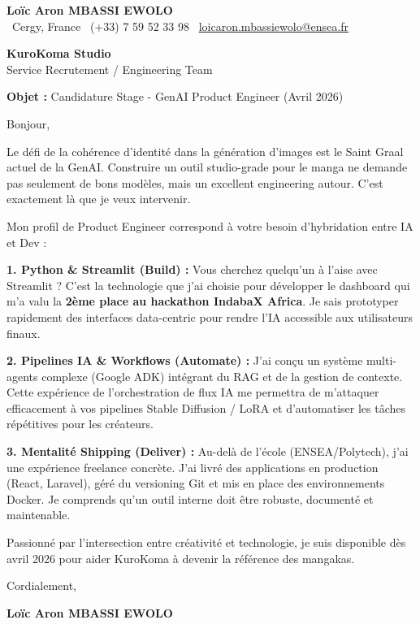 \documentclass[a4paper,11pt]{article}
\begin{document}
\begin{center}
    {\Large \textbf{Loïc Aron MBASSI EWOLO}}\\[4pt]
    \small
    \faMapMarker\ Cergy, France \quad
    \faPhone\ (+33) 7 59 52 33 98 \quad
    \faEnvelope\ \href{mailto:loicaron.mbassiewolo@ensea.fr}{loicaron.mbassiewolo@ensea.fr}
\end{center}
\vspace{0.5cm}

\hfill
\begin{minipage}[t]{0.45\textwidth}
    \textbf{KuroKoma Studio}\\
    Service Recrutement / Engineering Team
\end{minipage}

\vspace{1cm}

\textbf{Objet :} Candidature Stage - GenAI Product Engineer (Avril 2026)

Bonjour,

Le défi de la cohérence d'identité dans la génération d'images est le Saint Graal actuel de la GenAI. Construire un outil studio-grade pour le manga ne demande pas seulement de bons modèles, mais un excellent engineering autour. C'est exactement là que je veux intervenir.

Mon profil de Product Engineer correspond à votre besoin d'hybridation entre IA et Dev :

\textbf{1. Python & Streamlit (Build) :}
Vous cherchez quelqu'un à l'aise avec Streamlit ? C'est la technologie que j'ai choisie pour développer le dashboard qui m'a valu la \textbf{2ème place au hackathon IndabaX Africa}. Je sais prototyper rapidement des interfaces data-centric pour rendre l'IA accessible aux utilisateurs finaux.

\textbf{2. Pipelines IA & Workflows (Automate) :}
J'ai conçu un système multi-agents complexe (Google ADK) intégrant du RAG et de la gestion de contexte. Cette expérience de l'orchestration de flux IA me permettra de m'attaquer efficacement à vos pipelines Stable Diffusion / LoRA et d'automatiser les tâches répétitives pour les créateurs.

\textbf{3. Mentalité Shipping (Deliver) :}
Au-delà de l'école (ENSEA/Polytech), j'ai une expérience freelance concrète. J'ai livré des applications en production (React, Laravel), géré du versioning Git et mis en place des environnements Docker. Je comprends qu'un outil interne doit être robuste, documenté et maintenable.

Passionné par l'intersection entre créativité et technologie, je suis disponible dès avril 2026 pour aider KuroKoma à devenir la référence des mangakas.

Cordialement,

\vspace{1cm}

\textbf{Loïc Aron MBASSI EWOLO}
\end{document}
